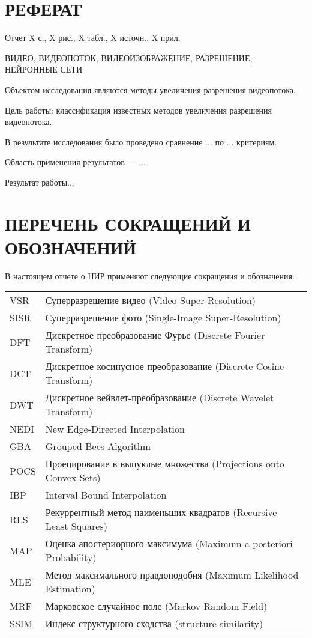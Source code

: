 \documentclass{bmstu}
\begin{document}


\setcounter{page}{3}

{\centering \chapter*{РЕФЕРАТ}}

Отчет X с., X рис., X табл., X источн., X прил.

\noindent ВИДЕО, ВИДЕОПОТОК, ВИДЕОИЗОБРАЖЕНИЕ, РАЗРЕШЕНИЕ, НЕЙРОННЫЕ СЕТИ

Объектом исследования являются методы увеличения разрешения видеопотока.

Цель работы: классификация известных методов увеличения разрешения видеопотока.

В результате исследования было проведено сравнение ... по ... критериям.

Область применения результатов --- ...

Результат работы...

\maketableofcontents

{\centering \chapter*{ПЕРЕЧЕНЬ СОКРАЩЕНИЙ И ОБОЗНАЧЕНИЙ}}

В настоящем отчете о НИР применяют следующие сокращения и обозначения:

\begin{table}[H]
\begin{tabular}{p{3cm}p{13.5cm}}
VSR & Суперразрешение видео (Video Super-Resolution)
\tabularnewline
SISR & Суперразрешение фото (Single-Image Super-Resolution)
\tabularnewline
DFT & Дискретное преобразование Фурье (Discrete Fourier Transform)
\tabularnewline
DCT & Дискретное косинусное преобразование (Discrete Cosine Transform)
\tabularnewline
DWT & Дискретное вейвлет-преобразование (Discrete Wavelet Transform)
\tabularnewline
NEDI & New Edge-Directed Interpolation
\tabularnewline
GBA & Grouped Bees Algorithm
\tabularnewline
POCS & Проецирование в выпуклые множества (Projections onto Convex Sets)
\tabularnewline
IBP & Interval Bound Interpolation
\tabularnewline
RLS & Рекуррентный метод наименьших квадратов (Recursive Least Squares)
\tabularnewline
MAP & Оценка апостериорного максимума (Maximum a posteriori Probability)
\tabularnewline
MLE & Метод максимального правдоподобия (Maximum Likelihood Estimation)
\tabularnewline
MRF & Марковское случайное поле (Markov Random Field)
\tabularnewline
SSIM & Индекс структурного сходства (structure similarity)
\tabularnewline
\end{tabular}
\end{table}
\end{document}
